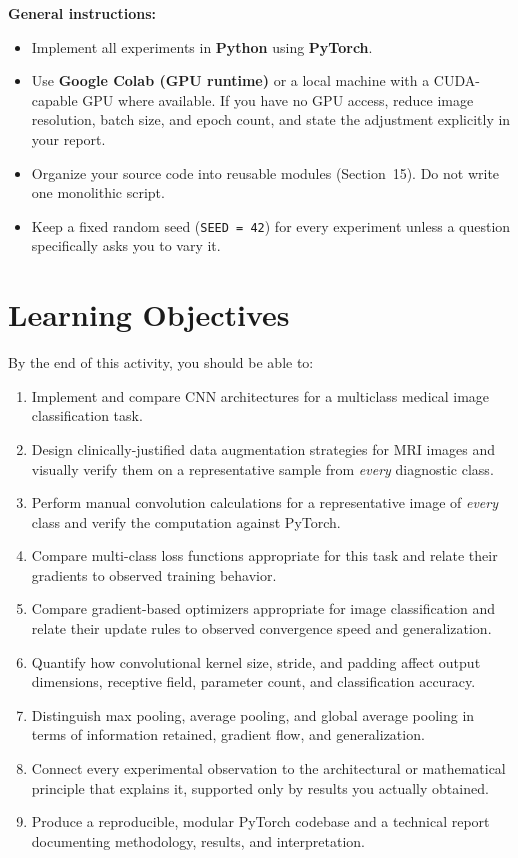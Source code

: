 \documentclass[12pt,a4paper]{article}
\begin{document}
\textbf{General instructions:}
\begin{itemize}[leftmargin=*]
  \item Implement all experiments in \textbf{Python} using \textbf{PyTorch}.
  \item Use \textbf{Google Colab (GPU runtime)} or a local machine with a CUDA-capable
        GPU where available. If you have no GPU access, reduce image resolution, batch
        size, and epoch count, and state the adjustment explicitly in your report.
  \item Organize your source code into reusable modules (Section~15). Do not write
        one monolithic script.
  \item Keep a fixed random seed (\texttt{SEED = 42}) for every experiment unless a
        question specifically asks you to vary it.
\end{itemize}

\section*{Learning Objectives}

By the end of this activity, you should be able to:
\begin{enumerate}[leftmargin=*, label=\arabic*.]
  \item Implement and compare CNN architectures for a multiclass medical image classification task.
  \item Design clinically-justified data augmentation strategies for MRI images and
        visually verify them on a representative sample from \emph{every} diagnostic class.
  \item Perform manual convolution calculations for a representative image of \emph{every}
        class and verify the computation against PyTorch.
  \item Compare multi-class loss functions appropriate for this task and
        relate their gradients to observed training behavior.
  \item Compare gradient-based optimizers appropriate for image classification and relate their
        update rules to observed convergence speed and generalization.
  \item Quantify how convolutional kernel size, stride, and padding affect output
        dimensions, receptive field, parameter count, and classification accuracy.
  \item Distinguish max pooling, average pooling, and global average pooling in terms
        of information retained, gradient flow, and generalization.
  \item Connect every experimental observation to the architectural or mathematical
        principle that explains it, supported only by results you actually obtained.
  \item Produce a reproducible, modular PyTorch codebase and a technical report
        documenting methodology, results, and interpretation.
\end{enumerate}
\end{document}
